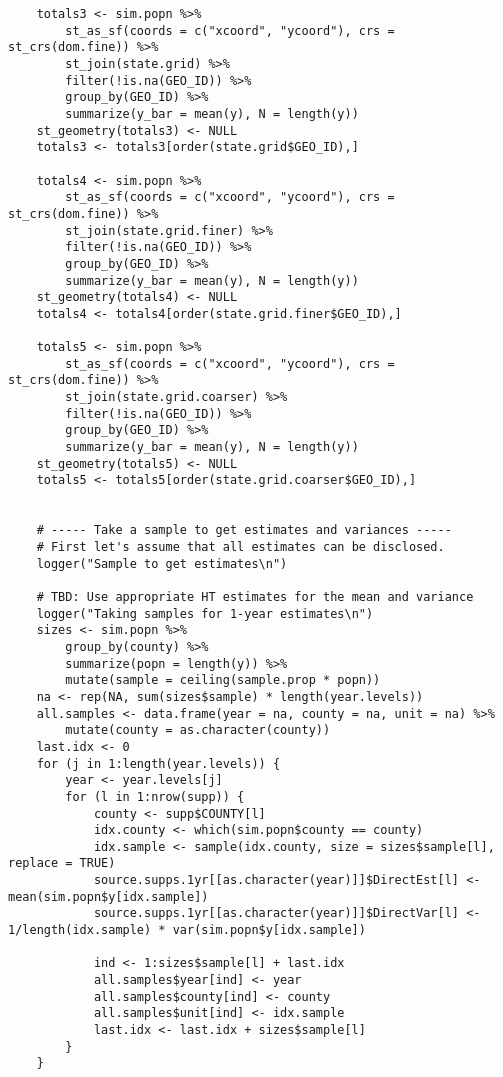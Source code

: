\documentclass[12pt]{article}
\begin{document}
\begin{scriptsize}
\begin{verbatim}
	totals3 <- sim.popn %>%
		st_as_sf(coords = c("xcoord", "ycoord"), crs = st_crs(dom.fine)) %>%
		st_join(state.grid) %>%
		filter(!is.na(GEO_ID)) %>%
		group_by(GEO_ID) %>%
		summarize(y_bar = mean(y), N = length(y))
	st_geometry(totals3) <- NULL
	totals3 <- totals3[order(state.grid$GEO_ID),]

	totals4 <- sim.popn %>%
		st_as_sf(coords = c("xcoord", "ycoord"), crs = st_crs(dom.fine)) %>%
		st_join(state.grid.finer) %>%
		filter(!is.na(GEO_ID)) %>%
		group_by(GEO_ID) %>%
		summarize(y_bar = mean(y), N = length(y))
	st_geometry(totals4) <- NULL
	totals4 <- totals4[order(state.grid.finer$GEO_ID),]

	totals5 <- sim.popn %>%
		st_as_sf(coords = c("xcoord", "ycoord"), crs = st_crs(dom.fine)) %>%
		st_join(state.grid.coarser) %>%
		filter(!is.na(GEO_ID)) %>%
		group_by(GEO_ID) %>%
		summarize(y_bar = mean(y), N = length(y))
	st_geometry(totals5) <- NULL
	totals5 <- totals5[order(state.grid.coarser$GEO_ID),]


	# ----- Take a sample to get estimates and variances -----
	# First let's assume that all estimates can be disclosed.
	logger("Sample to get estimates\n")

	# TBD: Use appropriate HT estimates for the mean and variance
	logger("Taking samples for 1-year estimates\n")
	sizes <- sim.popn %>%
		group_by(county) %>%
		summarize(popn = length(y)) %>%
		mutate(sample = ceiling(sample.prop * popn))
	na <- rep(NA, sum(sizes$sample) * length(year.levels))
	all.samples <- data.frame(year = na, county = na, unit = na) %>%
		mutate(county = as.character(county))
	last.idx <- 0
	for (j in 1:length(year.levels)) {
		year <- year.levels[j]
		for (l in 1:nrow(supp)) {
			county <- supp$COUNTY[l]
			idx.county <- which(sim.popn$county == county)
			idx.sample <- sample(idx.county, size = sizes$sample[l], replace = TRUE)
			source.supps.1yr[[as.character(year)]]$DirectEst[l] <- mean(sim.popn$y[idx.sample])
			source.supps.1yr[[as.character(year)]]$DirectVar[l] <- 1/length(idx.sample) * var(sim.popn$y[idx.sample])

			ind <- 1:sizes$sample[l] + last.idx
			all.samples$year[ind] <- year
			all.samples$county[ind] <- county
			all.samples$unit[ind] <- idx.sample
			last.idx <- last.idx + sizes$sample[l]
		}
	}


\end{verbatim}
\end{scriptsize}
\end{document}
